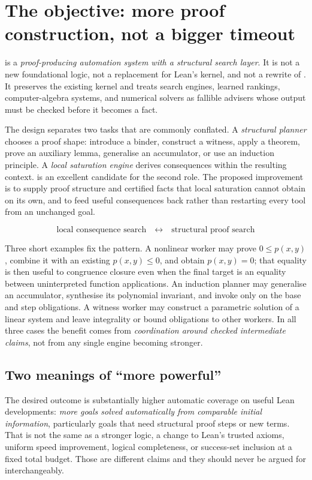 \section{The objective: more proof construction, not a bigger timeout}

\forge{} is a \emph{proof-producing automation system with a structural search
layer}. It is not a new foundational logic, not a replacement for Lean's
kernel, and not a rewrite of \grind{}. It preserves the existing kernel and
treats search engines, learned rankings, computer-algebra systems, and
numerical solvers as fallible advisers whose output must be checked before it
becomes a fact.

The design separates two tasks that are commonly conflated. A
\emph{structural planner} chooses a proof shape: introduce a binder,
construct a witness, apply a theorem, prove an auxiliary lemma, generalise an
accumulator, or use an induction principle. A \emph{local saturation engine}
derives consequences within the resulting context. \grind{} is an excellent
candidate for the second role. The proposed improvement is to supply proof
structure and certified facts that local saturation cannot obtain on its own,
and to feed useful consequences back rather than restarting every tool from an
unchanged goal.

\[
\boxed{\text{local consequence search}}
\quad\longleftrightarrow\quad
\boxed{\text{structural proof search}}
\]

Three short examples fix the pattern. A nonlinear worker may prove
$0\le p(x,y)$, combine it with an existing $p(x,y)\le0$, and obtain
$p(x,y)=0$; that equality is then useful to congruence closure even when the
final target is an equality between uninterpreted function applications. An
induction planner may generalise an accumulator, synthesise its polynomial
invariant, and invoke \grind{} only on the base and step obligations. A
witness worker may construct a parametric solution of a linear system and
leave integrality or bound obligations to other workers. In all three cases
the benefit comes from \emph{coordination around checked intermediate claims},
not from any single engine becoming stronger.

\subsection{Two meanings of ``more powerful''}

The desired outcome is substantially higher automatic coverage on useful Lean
developments: \emph{more goals solved automatically from comparable initial
information}, particularly goals that need structural proof steps or new
terms. That is not the same as a stronger logic, a change to Lean's trusted
axioms, uniform speed improvement, logical completeness, or success-set
inclusion at a fixed total budget. Those are different claims and they should
never be argued for interchangeably.

